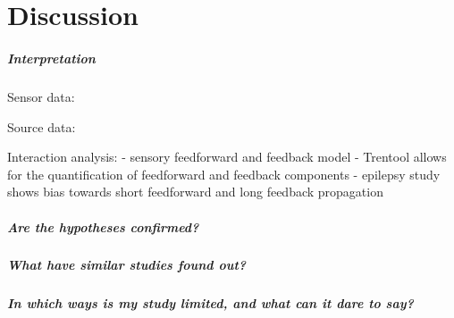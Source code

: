 
\chapter{Discussion}

\paragraph{Interpretation}
Sensor data:

Source data:

Interaction analysis:
- sensory feedforward and feedback model
- Trentool allows for the quantification of feedforward and feedback components
- epilepsy study shows bias towards short feedforward and long feedback propagation

\paragraph{Are the hypotheses confirmed?}

\paragraph{What have similar studies found out?}

\paragraph{In which ways is my study limited, and what can it dare to say?}
